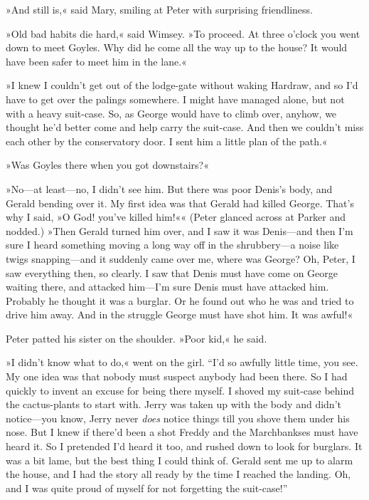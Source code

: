 »And still is,« said Mary, smiling at Peter with surprising friendliness.

»Old bad habits die hard,« said Wimsey. »To proceed. At three o'clock you went down to meet Goyles. Why did he come all the way up to the house? It would have been safer to meet him in the lane.«

»I knew I couldn't get out of the lodge-gate without waking Hardraw, and so I'd have to get over the palings somewhere. I might have managed alone, but not with a heavy suit-case. So, as George would have to climb over, anyhow, we thought he'd better come and help carry the suit-case. And then we couldn't miss each other by the conservatory door. I sent him a little plan of the path.«

»Was Goyles there when you got downstairs?«

»No\allowbreak---\allowbreak at least\allowbreak---\allowbreak no, I didn't see him. But there was poor Denis's body, and Gerald bending over it. My first idea was that Gerald had killed George. That's why I said, »O God! you've killed him!«« (Peter glanced across at Parker and nodded.) »Then Gerald turned him over, and I saw it was Denis\allowbreak---\allowbreak and then I'm sure I heard something moving a long way off in the shrubbery\allowbreak---\allowbreak a noise like twigs snapping\allowbreak---\allowbreak and it suddenly came over me, where was George? Oh, Peter, I saw everything then, so clearly. I saw that Denis must have come on George waiting there, and attacked him\allowbreak---\allowbreak I'm sure Denis must have attacked him. Probably he thought it was a burglar. Or he found out who he was and tried to drive him away. And in the struggle George must have shot him. It was awful!«

Peter patted his sister on the shoulder. »Poor kid,« he said.

»I didn't know what to do,« went on the girl. \enquote{I'd so awfully little time, you see. My one idea was that nobody must suspect anybody had been there. So I had quickly to invent an excuse for being there myself. I shoved my suit-case behind the cactus-plants to start with.  Jerry was taken up with the body and didn't notice\allowbreak---\allowbreak you know, Jerry never \textit{does} notice things till you shove them under his nose. But I knew if there'd been a shot Freddy and the Marchbankses must have heard it. So I pretended I'd heard it too, and rushed down to look for burglars. It was a bit lame, but the best thing I could think of.  Gerald sent me up to alarm the house, and I had the story all ready by the time I reached the landing. Oh, and I was quite proud of myself for not forgetting the suit-case!}

